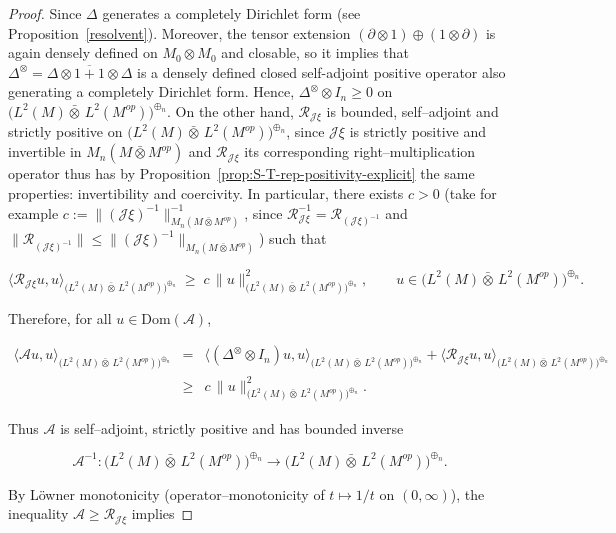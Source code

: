 \documentclass[10pt,a4paper,reqno]{amsart}
\newcommand{\Dom}{\mathrm{Dom}}
\begin{document}
\begin{proof}
Since $\Delta$ generates a completely Dirichlet form (see Proposition~\ref{resolvent}). Moreover, the tensor extension $(\partial \otimes1)\oplus(1\otimes\partial)$ is again densely defined on $M_0\otimes M_0$ and closable, so it implies that
$\Delta^{\otimes}=\overline{\Delta\otimes1+1\otimes\Delta}$ is a densely defined closed self-adjoint positive operator also generating a completely
Dirichlet form. Hence, $\Delta^{\otimes}\otimes I_n\ge0$ on
$\big(L^2(M){\bar\otimes}\,L^2(M^{op})\big)^{\oplus_n}$.  On the other hand, $\mathcal{R}_{\mathscr{J}\xi}$ is bounded,
self–adjoint and strictly positive on
$\big(L^2(M){\bar\otimes}\,L^2(M^{op})\big)^{\oplus_n}$, since $\mathscr J\xi$ is
strictly positive and invertible in $M_n(M\bar\otimes M^{op})$ and
$\mathcal R_{\mathscr J\xi}$ its corresponding right–multiplication operator thus has by Proposition~\ref{prop:S-T-rep-positivity-explicit} the same properties: invertibility and coercivity. In
particular, there exists $c>0$ (take for example $c:=\|(\mathscr J\xi)^{-1}\|_{M_n(M\bar\otimes M^{op})}^{-1}$, since $\mathcal R_{\mathscr J\xi}^{-1}=\mathcal R_{(\mathscr J\xi)^{-1}}$ and $\|\mathcal R_{(\mathscr J\xi)^{-1}}\|\le \|(\mathscr J\xi)^{-1}\|_{M_n(M\bar\otimes M^{op})}$)  such that


\[
\langle \mathcal{R}_{\mathscr{J}\xi}u,u\rangle_{ \big(L^2(M){\bar\otimes}\,L^2(M^{op})\big)^{\oplus_n}}
\;\ge\;
c\,\|u\|_{ \big(L^2(M){\bar\otimes}\,L^2(M^{op})\big)^{\oplus_n}}^2,
\qquad u\in \big(L^2(M){\bar\otimes}\,L^2(M^{op})\big)^{\oplus_n}.
\]


Therefore, for all $u\in \Dom(\mathcal{A})$,


\begin{eqnarray}
\langle \mathcal{A}u,u\rangle_{ \big(L^2(M){\bar\otimes}\,L^2(M^{op})\big)^{\oplus_n}}
&=&
\langle (\Delta^{\otimes}\otimes I_n)u,u\rangle_{ \big(L^2(M){\bar\otimes}\,L^2(M^{op})\big)^{\oplus_n}}
+
\langle \mathcal{R}_{\mathscr{J}\xi}u,u\rangle_{ \big(L^2(M){\bar\otimes}\,L^2(M^{op})\big)^{\oplus_n}}\nonumber\\
&\ge&
c\,\|u\|_{\big(L^2(M){\bar\otimes}\,L^2(M^{op})\big)^{\oplus_n}}^2.
\end{eqnarray}


Thus $\mathcal{A}$ is self–adjoint, strictly positive and has bounded inverse


\[
\mathcal{A}^{-1}:\big(L^2(M){\bar\otimes}\,L^2(M^{op})\big)^{\oplus_n}\to
\big(L^2(M){\bar\otimes}\,L^2(M^{op})\big)^{\oplus_n}.
\]



By Löwner monotonicity (operator–monotonicity of $t\mapsto 1/t$ on $(0,\infty)$),
the inequality $\mathcal{A}\ge \mathcal{R}_{\mathscr{J}\xi}$ implies



\end{proof}
\end{document}
